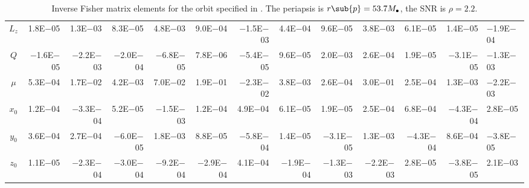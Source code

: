 \begin{sidewaystable}[htbp]
\begin{tabular}{crrrrrrrrrrr}
$L_z$ & 1.8E$-$05 & 1.3E$-$03 & 8.3E$-$05 & 4.8E$-$03 & 9.0E$-$04 & $-$1.5E$-$03 & 4.4E$-$04 & 9.6E$-$05 & 3.8E$-$03 & 6.1E$-$05 & 1.4E$-$05 & $-$1.9E$-$04 \\
$Q$ & $-$1.6E$-$05 & $-$2.2E$-$03 & $-$2.0E$-$04 & $-$6.8E$-$05 & 7.8E$-$06 & $-$5.4E$-$05 & 9.6E$-$05 & 2.0E$-$03 & 2.6E$-$04 & 1.9E$-$05 & $-$3.1E$-$05 & $-$1.3E$-$03 \\
$\mu$ & 5.3E$-$04 & 1.7E$-$02 & 4.2E$-$03 & 7.0E$-$02 & 1.9E$-$01 & $-$2.3E$-$02 & 3.8E$-$03 & 2.6E$-$04 & 3.0E$-$01 & 2.5E$-$04 & 1.3E$-$03 & $-$2.2E$-$03 \\
$x_0$ & 1.2E$-$04 & $-$3.3E$-$04 & 5.2E$-$05 & $-$1.5E$-$03 & 1.2E$-$04 & 4.9E$-$04 & 6.1E$-$05 & 1.9E$-$05 & 2.5E$-$04 & 6.8E$-$04 & $-$4.3E$-$04 & 2.8E$-$05 \\
$y_0$ & 3.6E$-$04 & 2.7E$-$04 & $-$6.0E$-$05 & 1.8E$-$03 & 8.8E$-$05 & $-$5.8E$-$04 & 1.4E$-$05 & $-$3.1E$-$05 & 1.3E$-$03 & $-$4.3E$-$04 & 8.6E$-$04 & $-$3.8E$-$05 \\
$z_0$ & 1.1E$-$05 & $-$2.3E$-$04 & $-$3.0E$-$04 & $-$9.2E$-$04 & $-$2.9E$-$04 & 4.1E$-$04 & $-$1.9E$-$04 & $-$1.3E$-$03 & $-$2.2E$-$03 & 2.8E$-$05 & $-$3.8E$-$05 & 2.1E$-$03 \\
\bottomrule
\end{tabular}
\caption{Inverse Fisher matrix elements for the orbit specified in . The periapsis is $r\sub{p} = 53.7 M_\bullet$, the SNR is $\rho = 2.2$.}
\label{tab:Fisher_5}
\end{sidewaystable}

